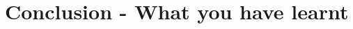 \documentclass{42-en}
\begin{document}

\newpage

\newpage

\newpage

\newpage

\newpage

\newpage

\newpage

\newpage

\newpage

\newpage
\chapter{Conclusion - What you have learnt}
\end{document}
